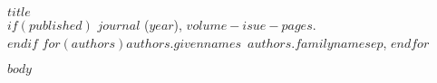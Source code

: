 \graphicspath{{manuscript/}{\chapter1/manuscript/}}

\begin{center}
\textbf{$title$} \\
$if(published)$
\textit{$journal$} ($year$), $volume-isue-pages$. \\
$endif$
$for(authors)$$authors.givennames$~$authors.familyname$$sep$, $endfor$
\end{center}

$body$

\singlespacing
{\renewcommand{\bibname}{References}
\renewcommand{\bibsection}{\section{\bibname}}
}
